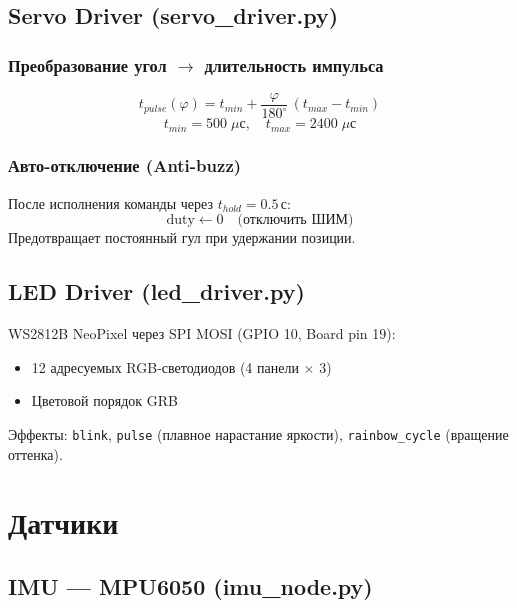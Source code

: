 \documentclass[12pt, a4paper]{article}
\begin{document}
\subsection{Servo Driver (servo\_driver.py)}

\subsubsection{Преобразование угол $\to$ длительность импульса}
\begin{equation}
  t_{pulse}(\varphi) = t_{min} + \frac{\varphi}{180^\circ}\,(t_{max} - t_{min})
\end{equation}
\begin{equation}
  t_{min} = 500\;\mu\text{с},\quad t_{max} = 2400\;\mu\text{с}
\end{equation}

\subsubsection{Авто-отключение (Anti-buzz)}
После исполнения команды через $t_{hold} = 0.5$\,с:
\begin{equation}
  \text{duty} \leftarrow 0 \quad \text{(отключить ШИМ)}
\end{equation}
Предотвращает постоянный гул при удержании позиции.

\subsection{LED Driver (led\_driver.py)}

WS2812B NeoPixel через SPI MOSI (GPIO 10, Board pin 19):
\begin{itemize}[noitemsep]
  \item 12 адресуемых RGB-светодиодов (4 панели × 3)
  \item Цветовой порядок GRB
\end{itemize}

Эффекты: \texttt{blink}, \texttt{pulse} (плавное нарастание яркости), \texttt{rainbow\_cycle} (вращение оттенка).

\newpage
\section{Датчики}
\label{sec:sensors}

\subsection{IMU — MPU6050 (imu\_node.py)}
\label{sec:imu_hw}
\end{document}

